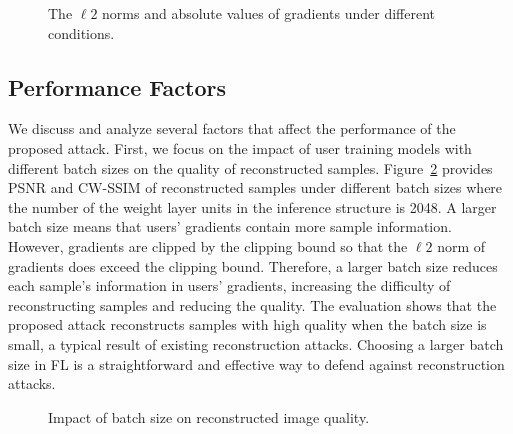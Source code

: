 \documentclass[lettersize,journal]{IEEEtran}
\begin{document}
\begin{figure}
\centering
{}\hspace{-0.1in}
\caption{The $\ell2$ norms and absolute values of gradients under different conditions.}
\label{fig-evaluation-norm-comparison}
\end{figure}

\subsection{Performance Factors}
\label{section-evaluation-factors}

We discuss and analyze several factors that affect the performance of the proposed attack.
First, we focus on the impact of user training models with different batch sizes on the quality of reconstructed samples. Figure~\ref{fig-evaluation-performance-batch-size} provides PSNR and CW-SSIM of reconstructed samples under different batch sizes where the number of the weight layer units in the inference structure is 2048. A larger batch size means that users' gradients contain more sample information. However, gradients are clipped by the clipping bound so that the $\ell2$ norm of gradients does exceed the clipping bound. Therefore, a larger batch size reduces each sample's information in users' gradients, increasing the difficulty of reconstructing samples and reducing the quality. The evaluation shows that the proposed attack reconstructs samples with high quality when the batch size is small, a typical result of existing reconstruction attacks. Choosing a larger batch size in FL is a straightforward and effective way to defend against reconstruction attacks.

\begin{figure}
\centering
{}\hspace{-0.1in}
\caption{Impact of batch size on reconstructed image quality.}
\label{fig-evaluation-performance-batch-size}
\end{figure}
\end{document}
